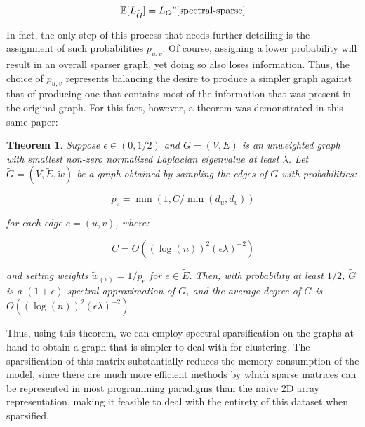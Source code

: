 \documentclass{article}
\newtheorem{theorem}{Theorem}[section]
\begin{document}
$$ \mathbb{E}[L_{\widetilde{G}}] = L_{G}" \cite{spectral-sparse} $$

In fact, the only step of this process that needs further detailing is the assignment of such probabilities $p_{u,v}$. Of course, assigning a lower probability will result in an overall sparser graph, yet doing so also loses information. Thus, the choice of $p_{u,v}$ represents balancing the desire to produce a simpler graph against that of producing one that contains most of the information that was present in the original graph. For this fact, however, a theorem was demonstrated in this same paper:

\begin{theorem}
Suppose $\epsilon\in(0,1/2)$ and $G = (V, E)$ is an unweighted graph with smallest non-zero normalized Laplacian eigenvalue at least $\lambda$. Let $\widetilde{G} = (V, \widetilde{E}, \widetilde{w})$ be a graph obtained by sampling the edges of $G$ with probabilities:

$$ p_e = \min (1,C/\min(d_u, d_v)) $$

for each edge $e = (u,v )$, where: 

$$ C = \Theta ((\log(n))^2 (\epsilon\lambda)^{-2} ) $$

and setting weights $\widetilde{w}_{(e)} = 1/p_e$  for $e\in\widetilde{E}$. Then, with probability at least $1/2$, $\widetilde{G}$ is a $(1 + \epsilon)$-spectral approximation of $G$, and the average degree of $\widetilde{G}$ is $O((\log(n))^2 (\epsilon\lambda)^{−2} )$ \cite{spectral-sparse}
\end{theorem}

Thus, using this theorem, we can employ spectral sparsification on the graphs at hand to obtain a graph that is simpler to deal with for clustering. The sparsification of this matrix substantially reduces the memory consumption of the model, since there are much more efficient methods by which sparse matrices can be represented in most programming paradigms than the naive 2D array representation, making it feasible to deal with the entirety of this dataset when sparsified.
\end{document}
